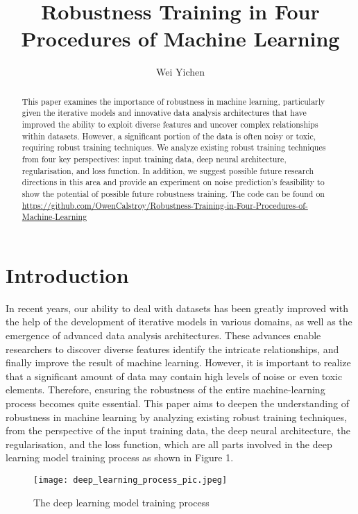 \documentclass{article}
\title{Robustness Training in Four Procedures of Machine Learning}
\author{Wei Yichen}
\begin{document}
\maketitle

\begin{abstract}
This paper examines the importance of robustness in machine learning, particularly given the iterative models and innovative data analysis architectures that have improved the ability to exploit diverse features and uncover complex relationships within datasets. However, a significant portion of the data is often noisy or toxic, requiring robust training techniques. We analyze existing robust training techniques from four key perspectives: input training data, deep neural architecture, regularisation, and loss function. In addition, we suggest possible future research directions in this area and provide an experiment on noise prediction's feasibility to show the potential of possible future robustness training. The code can be found on \url{https://github.com/OwenCalstroy/Robustness-Training-in-Four-Procedures-of-Machine-Learning}
\end{abstract}

\section{Introduction}

In recent years, our ability to deal with datasets has been greatly improved with the help of the development of iterative models in various domains, as well as the emergence of advanced data analysis architectures. These advances enable researchers to discover diverse features identify the intricate relationships, and finally improve the result of machine learning. However, it is important to realize that a significant amount of data may contain high levels of noise or even toxic elements. Therefore, ensuring the robustness of the entire machine-learning process becomes quite essential. This paper aims to deepen the understanding of robustness in machine learning by analyzing existing robust training techniques, from the perspective of the input training data, the deep neural architecture, the regularisation, and the loss function, which are all parts involved in the deep learning model training process as shown in Figure 1.

\begin{figure}
\centering
\texttt{[image: deep\_learning\_process\_pic.jpeg]}
\caption{\label{figure 1:}The deep learning model training process}
\end{figure}
\end{document}
